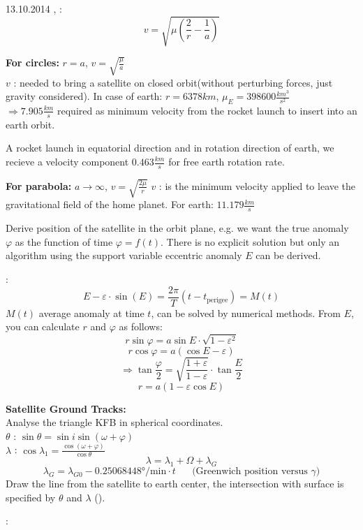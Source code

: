 \begin{chapter}{13.10.2014}
 , :
 \[ v = \sqrt{\mu \left( \frac{2}{r} - \frac{1}{a} \right)} \]

 \textbf{For circles:} $r=a$, $v=\sqrt{\frac{\mu}{a}}$\\
 $v$ : needed to bring a satellite on closed orbit(without perturbing forces, just gravity considered). In case of earth: $r = 6378km$, $\mu_E = 398600 \frac{km^3}{s^2}$\\
 $\Rightarrow 7.905 \frac{km}{s}$ required as minimum velocity from the rocket launch to insert into an earth orbit.
 
 A rocket launch in equatorial direction and in rotation direction of earth, we recieve a velocity component $0.463 \frac{km}{s}$ for free earth rotation rate.
 
 \textbf{For parabola:} $a\rightarrow \infty$, $v = \sqrt{\frac{2\mu}{r}}$
 $v$ : is the minimum velocity applied to leave the gravitational field of the home planet. For earth: $11.179 \frac{km}{s}$

 Derive position of the satellite in the orbit plane, e.g. we want the true anomaly $\varphi$ as the function of time $\varphi = f(t)$. There is no explicit solution but only an algorithm using the support variable eccentric anomaly $E$ can be derived.
 
 \textbf{}:
 \[ E - \varepsilon\cdot\sin(E) = \frac{2\pi}{T}(t-t_\text{perigee}) =M(t) \]
 $M(t)$ average anomaly at time $t$, can be solved by numerical methods. From $E$, you can calculate $r$ and $\varphi$ as follows:\\
 \[r\sin\varphi = a\sin E \cdot \sqrt{1-\varepsilon^2}\]
 \[r\cos\varphi = a(\cos E - \varepsilon)\]
 \[\Rightarrow \tan \frac{\varphi}{2} = \sqrt{\frac{1+\varepsilon}{1-\varepsilon}}\cdot \tan\frac{E}{2}\]
 \[r=a(1-\varepsilon\cos E)\]
 
 \textbf{Satellite Ground Tracks:}\\
 Analyse the triangle KFB in spherical coordinates.\\
 $\theta$ : $\sin \theta = \sin i \sin (\omega + \varphi)$\\
 $\lambda$ : $\cos \lambda_1 = \frac{\cos(\omega + \varphi)}{\cos \theta}$
 \[ \lambda = \lambda_1 + \Omega + \lambda_G \]
 \[ \lambda_G = \lambda_{G0} - 0.25068448° /\text{min} \cdot t \text{~~~~~(Greenwich position versus $\gamma$)}\]
 Draw the line from the satellite to earth center, the intersection with surface is specified by $\theta$ and $\lambda$ ().
 
 \textbf{}:
 
 
\end{chapter} 